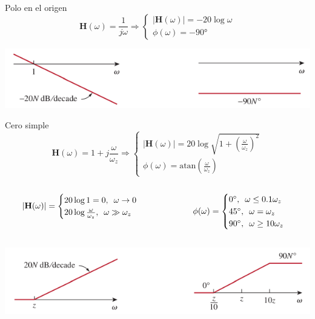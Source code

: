 \documentclass[aspectratio=169, usenames,svgnames,dvipsnames]{beamer}
\newcommand{\fasor}[1]{\mathbf{#1}(\omega)}
\newcommand{\atan}{\mathrm{atan}}
\begin{document}
\begin{frame}[label={sec:org77730de}]{Polo en el origen}
\[
  \fasor{H} = \frac{1}{j\omega} \Rightarrow
  \begin{cases}
    |\fasor{H}| = - 20 \log \omega\\
    \phi(\omega) = - \ang{90}
  \end{cases}
\]

\begin{center}
\includegraphics[width=.9\linewidth]{../figs/BodePoloOrigen.pdf}
\end{center}
\end{frame}

\begin{frame}[label={sec:org0774474}]{Cero simple}
\[
  \fasor{H} = 1 + j\frac{\omega}{\omega_z} \Rightarrow
  \begin{cases}
    |\fasor{H}| =  20 \log \sqrt{1 + \left(\frac{\omega}{\omega_z}\right)^2}\\
    \phi(\omega) = \atan(\frac{\omega}{\omega_z}) 
  \end{cases}
\]

\begin{columns}
\begin{column}{0.5\columnwidth}
\[
  |\fasor{H}| = 
  \begin{cases}
  20 \log 1 = 0, \enskip \omega \to 0\\
  20 \log \frac{\omega}{\omega_z}, \enskip \omega \gg \omega_z\\
  \end{cases}
\]
\end{column}

\begin{column}{0.5\columnwidth}
\[
  \phi(\omega) = 
  \begin{cases}
    \ang{0},\enskip \omega \leq 0.1\omega_z\\
    \ang{45}, \enskip \omega = \omega_z\\
    \ang{90}, \enskip \omega \geq 10\omega_z\\
  \end{cases}
\]
\end{column}
\end{columns}

\begin{center}
\includegraphics[width=.9\linewidth]{../figs/BodeCeroSimple.pdf}
\end{center}
\end{frame}
\end{document}
